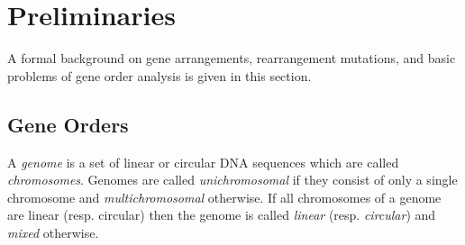 \documentclass{svmult}
\newcommand{\m}[1]{\mathcal{#1}}
\begin{document}
% 
% 
% 

\section{Preliminaries}
\label{Sec-Pre}

A formal background on gene arrangements, rearrangement mutations, and basic
problems of gene order analysis is given in this section.

\subsection{Gene Orders}
A \emph{genome} is a set of linear or circular DNA sequences which are called \emph{chromosomes}. 
Genomes are called \emph{unichromosomal} if they consist of only a single chromosome and \emph{multi\-chromosomal} otherwise. 
If all chromosomes of a genome are linear (resp. circular) then the genome is called \emph{linear} 
(resp. \emph{circular}) and \emph{mixed} otherwise. 
\end{document}
